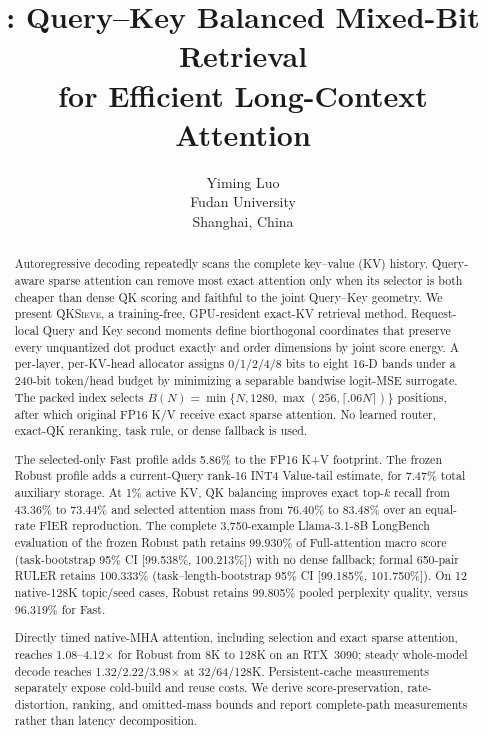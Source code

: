 \documentclass{article}
\title{\method: Query--Key Balanced Mixed-Bit Retrieval\\
for Efficient Long-Context Attention}
\author{Yiming Luo\\
Fudan University\\
Shanghai, China}
\newcommand{\method}{\textsc{QKSieve}\xspace}
\newcommand{\1}{\mathbf{1}}
\begin{document}
\maketitle
\ifdefined\QKSIEVEAUTHORVERSION
\fi

\begin{abstract}
Autoregressive decoding repeatedly scans the complete key--value (KV)
history.  Query-aware sparse attention can remove most exact attention only
when its selector is both cheaper than dense QK scoring and faithful to the
joint Query--Key geometry.  We present \method, a training-free,
GPU-resident exact-KV retrieval method.  Request-local Query and Key second
moments define biorthogonal coordinates that preserve every unquantized dot
product exactly and order dimensions by joint score energy.  A per-layer,
per-KV-head allocator assigns 0/1/2/4/8 bits to eight 16-D bands under a
240-bit token/head budget by minimizing a separable bandwise logit-MSE
surrogate.  The
packed index selects
$B(N)=\min\{N,1280,\max(256,\lceil.06N\rceil)\}$ positions, after which
original FP16 K/V receive exact sparse attention.  No learned router,
exact-QK reranking, task rule, or dense fallback is used.

The selected-only Fast profile adds 5.86\% to the FP16 K+V footprint.  The
frozen Robust profile adds a current-Query rank-16 INT4 Value-tail estimate,
for 7.47\% total auxiliary storage.  At 1\% active KV, QK balancing improves
exact top-$k$ recall from 43.36\% to 73.44\% and selected attention mass from
76.40\% to 83.48\% over an equal-rate FIER reproduction.  The complete
3,750-example Llama-3.1-8B LongBench evaluation of the frozen Robust path
retains 99.930\% of Full-attention macro score (task-bootstrap 95\% CI
[99.538\%, 100.213\%]) with no dense fallback; formal 650-pair RULER retains
100.333\% (task--length-bootstrap 95\% CI [99.185\%, 101.750\%]).  On 12
native-128K topic/seed cases, Robust
retains 99.805\% pooled perplexity quality, versus 96.319\% for Fast.

Directly timed native-MHA attention, including selection and exact sparse
attention, reaches 1.08--4.12$\times$ for Robust from 8K to 128K on an
RTX~3090; steady whole-model decode reaches 1.32/2.22/3.98$\times$ at
32/64/128K.  Persistent-cache measurements separately expose cold-build and
reuse costs.  We derive score-preservation, rate-distortion, ranking, and
omitted-mass bounds and report complete-path measurements rather than latency
decomposition.
\end{abstract}
\end{document}
